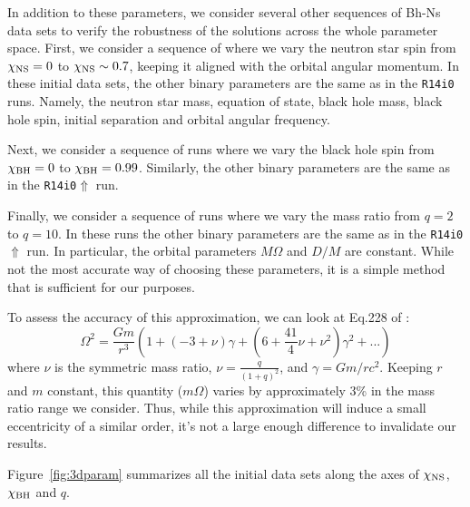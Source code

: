 In addition to these parameters, we consider several other sequences
of Bh-Ns data sets to verify the robustness of the solutions across
the whole parameter space. First, we consider a sequence of where we vary the neutron star spin from
$\chi_{\rm NS}=0$ to $\chi_{\rm NS}\sim0.7$, keeping it aligned with the orbital angular momentum. In these initial data sets, the other binary parameters are the same
as in the {\tt R14i0} runs. Namely, the neutron star mass, equation of state, black hole mass, black hole spin, initial separation and orbital angular frequency.

Next, we consider a sequence of runs where we vary the black hole spin from $\chi_{\rm BH}=0$ to $\chi_{\rm BH}=0.99$. Similarly, the other binary parameters are the same as in the {\tt R14i0$\Uparrow$} run.

Finally, we consider a sequence of runs where we vary the mass ratio from $q=2$ to $q=10$. In these runs the other binary parameters are the same as in the {\tt R14i0$\Uparrow$} run. In particular, the orbital parameters $M\Omega$ and $D/M$ are constant. While not the most accurate way of choosing these parameters, it is a simple method that is sufficient for our purposes.

To assess the accuracy of this approximation, we can look at Eq.228 of \cite{Blanchet2006}:
\begin{equation}
\Omega^2=\frac{Gm}{r^3}\left(1+(-3+\nu)\gamma+\left(6+\frac{41}{4}\nu+\nu^2\right)\gamma^2+...\right)
\end{equation}
where $\nu$ is the symmetric mass ratio, $\nu=\frac{q}{(1+q)^2}$, and $\gamma=Gm/rc^2$. Keeping $r$ and $m$ constant, this quantity ($m\Omega$) varies by approximately 3\% in the mass ratio range we consider.
Thus, while this approximation will induce a small eccentricity of a similar order, it's not a large enough difference to invalidate our results.

Figure~\ref{fig:3dparam} summarizes all the initial data sets along the axes of $\chi_{\rm NS}$, $\chi_{\rm BH}$ and $q$.

